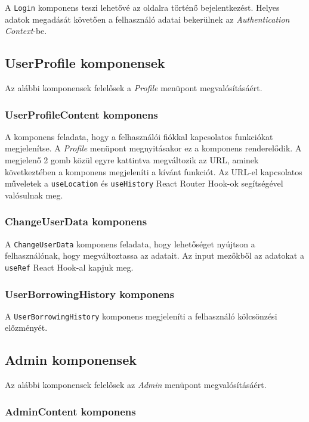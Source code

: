 A \texttt{Login} komponens teszi lehetővé az oldalra történő bejelentkezést. Helyes adatok megadását követően a felhasználó adatai bekerülnek az \textit{Authentication Context}-be.

\subsection{UserProfile komponensek}

Az alábbi komponensek felelősek a \textit{Profile} menüpont megvalósításáért.

\subsubsection{UserProfileContent komponens}

A komponens feladata, hogy a felhasználói fiókkal kapcsolatos funkciókat megjelenítse. A \textit{Profile} menüpont megnyitásakor ez a komponens renderelődik. A megjelenő 2 gomb közül egyre kattintva megváltozik az URL, aminek következtében a komponens megjeleníti a kívánt funkciót. Az URL-el kapcsolatos műveletek a \texttt{useLocation} és \texttt{useHistory} React Router Hook-ok segítségével valósulnak meg.

\subsubsection{ChangeUserData komponens}

A \texttt{ChangeUserData} komponens feladata, hogy lehetőséget nyújtson a felhasználónak, hogy megváltoztassa az adatait. Az input mezőkből az adatokat a \texttt{useRef} React Hook-al kapjuk meg.

\subsubsection{UserBorrowingHistory komponens}

A \texttt{UserBorrowingHistory} komponens megjeleníti a felhasználó kölcsönzési előzményét. 

\subsection{Admin komponensek}

Az alábbi komponensek felelősek az \textit{Admin} menüpont megvalósításáért.

\subsubsection{AdminContent komponens}

